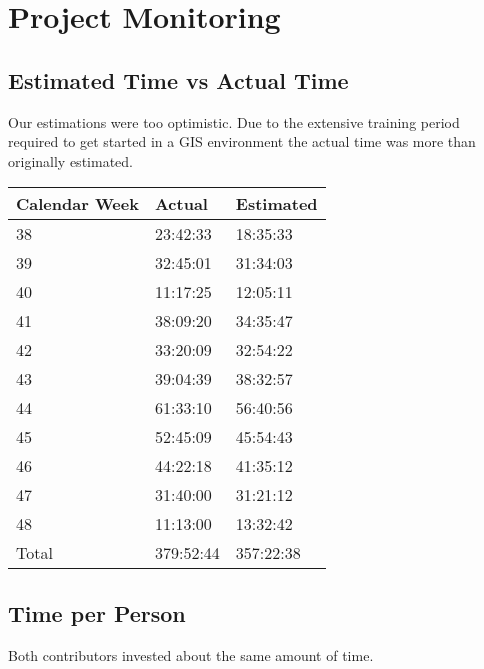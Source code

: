 \newpage
\chapter{Project Monitoring}\label{project monitoring}


\section{Estimated Time vs Actual Time}

Our estimations were too optimistic. Due to the extensive
training period required to get started in a GIS environment
the actual time was more than originally estimated.


\begin{center}
    \begin{tabular}{lll}
    \hline
    Calendar Week & Actual & Estimated    \\
    \hline
    38     & 23:42:33         & 18:35:33          \\
    39     & 32:45:01         & 31:34:03          \\
    40     & 11:17:25         & 12:05:11          \\
    41     & 38:09:20         & 34:35:47          \\
    42     & 33:20:09         & 32:54:22          \\
    43     & 39:04:39         & 38:32:57          \\
    44     & 61:33:10         & 56:40:56          \\
    45     & 52:45:09         & 45:54:43          \\
    46     & 44:22:18         & 41:35:12          \\
    47     & 31:40:00         & 31:21:12          \\
    48     & 11:13:00         & 13:32:42          \\
    \hline
    Total & 379:52:44        & 357:22:38         \\
    \end{tabular}
\end{center}

\section{Time per Person}

Both contributors invested about the same amount of time.

